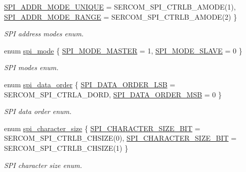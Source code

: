 \begin{DoxyCompactItemize}
\mbox{\hyperlink{group__asfdoc__sam0__sercom__spi__group_gga30bf0ce7e5f944a5d3a42d90f0ebf617a1515f491a88330b601198c1792fda41a}{S\+P\+I\+\_\+\+A\+D\+D\+R\+\_\+\+M\+O\+D\+E\+\_\+\+U\+N\+I\+Q\+UE}} = S\+E\+R\+C\+O\+M\+\_\+\+S\+P\+I\+\_\+\+C\+T\+R\+L\+B\+\_\+\+A\+M\+O\+DE(1), 
\mbox{\hyperlink{group__asfdoc__sam0__sercom__spi__group_gga30bf0ce7e5f944a5d3a42d90f0ebf617a4205716bda98deed62a4c6d5c8ec9944}{S\+P\+I\+\_\+\+A\+D\+D\+R\+\_\+\+M\+O\+D\+E\+\_\+\+R\+A\+N\+GE}} = S\+E\+R\+C\+O\+M\+\_\+\+S\+P\+I\+\_\+\+C\+T\+R\+L\+B\+\_\+\+A\+M\+O\+DE(2)
 \}
\begin{DoxyCompactList}\small\item\em S\+PI address modes enum. \end{DoxyCompactList}\item 
enum \mbox{\hyperlink{group__asfdoc__sam0__sercom__spi__group_ga78c1313670220bedfecdb138d4c27903}{spi\+\_\+mode}} \{ \mbox{\hyperlink{group__asfdoc__sam0__sercom__spi__group_gga78c1313670220bedfecdb138d4c27903ae68a8adf6e5b67a7bdbe9526b15dae99}{S\+P\+I\+\_\+\+M\+O\+D\+E\+\_\+\+M\+A\+S\+T\+ER}} = 1, 
\mbox{\hyperlink{group__asfdoc__sam0__sercom__spi__group_gga78c1313670220bedfecdb138d4c27903ad1131ed33ad43ab3f667070b04454439}{S\+P\+I\+\_\+\+M\+O\+D\+E\+\_\+\+S\+L\+A\+VE}} = 0
 \}
\begin{DoxyCompactList}\small\item\em S\+PI modes enum. \end{DoxyCompactList}\item 
enum \mbox{\hyperlink{group__asfdoc__sam0__sercom__spi__group_gabaa69dbc0601cb5b1e2681400598a4b2}{spi\+\_\+data\+\_\+order}} \{ \mbox{\hyperlink{group__asfdoc__sam0__sercom__spi__group_ggabaa69dbc0601cb5b1e2681400598a4b2ab016ca9032d6e9418d834514cc95b7d3}{S\+P\+I\+\_\+\+D\+A\+T\+A\+\_\+\+O\+R\+D\+E\+R\+\_\+\+L\+SB}} = S\+E\+R\+C\+O\+M\+\_\+\+S\+P\+I\+\_\+\+C\+T\+R\+L\+A\+\_\+\+D\+O\+RD, 
\mbox{\hyperlink{group__asfdoc__sam0__sercom__spi__group_ggabaa69dbc0601cb5b1e2681400598a4b2a7eb5ed4b7d6f993acd7d09a5d8db3687}{S\+P\+I\+\_\+\+D\+A\+T\+A\+\_\+\+O\+R\+D\+E\+R\+\_\+\+M\+SB}} = 0
 \}
\begin{DoxyCompactList}\small\item\em S\+PI data order enum. \end{DoxyCompactList}\item 
enum \mbox{\hyperlink{group__asfdoc__sam0__sercom__spi__group_ga79e8becd0bcea19b99e7eb7fe8a9d6b7}{spi\+\_\+character\+\_\+size}} \{ \mbox{\hyperlink{group__asfdoc__sam0__sercom__spi__group_gga79e8becd0bcea19b99e7eb7fe8a9d6b7a66283e49623ad09896942662b8221de6}{S\+P\+I\+\_\+\+C\+H\+A\+R\+A\+C\+T\+E\+R\+\_\+\+S\+I\+Z\+E\+\_\+B\+IT}} = S\+E\+R\+C\+O\+M\+\_\+\+S\+P\+I\+\_\+\+C\+T\+R\+L\+B\+\_\+\+C\+H\+S\+I\+ZE(0), 
\mbox{\hyperlink{group__asfdoc__sam0__sercom__spi__group_gga79e8becd0bcea19b99e7eb7fe8a9d6b7ab70647e252f3251aac0100b56c3d30af}{S\+P\+I\+\_\+\+C\+H\+A\+R\+A\+C\+T\+E\+R\+\_\+\+S\+I\+Z\+E\+\_\+B\+IT}} = S\+E\+R\+C\+O\+M\+\_\+\+S\+P\+I\+\_\+\+C\+T\+R\+L\+B\+\_\+\+C\+H\+S\+I\+ZE(1)
 \}
\begin{DoxyCompactList}\small\item\em S\+PI character size enum. \end{DoxyCompactList}\end{DoxyCompactItemize}

